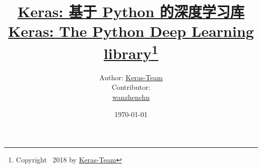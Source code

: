 \documentclass[11pt,a4paper,titlepage]{ctexart}
\begin{document}

\title{\huge \href{https://github.com/wanzhenchn/keras-docs-zh}{Keras: 基于 Python 的深度学习库 \\ Keras: The Python Deep Learning library}\thanks{Copyright \textcopyright\ 2018 by \href{https://github.com/keras-team}{Keras-Team}}\vspace{0.7cm}}
\author{\Large Author: \href{https://github.com/keras-team}{Keras-Team}\vspace{0.2cm}\\
Contributor: \Large{} \vspace{0.2cm}\\
{\color{blue}\faGithub}\hspace{0.1cm} {\href{https://github.com/wanzhenchn}{wanzhenchn}}\\
{\color{blue}\faEnvelopeO} 
\vspace{0.6cm}}
\date{\today}

\maketitle






\begingroup    %
\tableofcontents %
\endgroup
\clearpage
{}%
\end{document}

